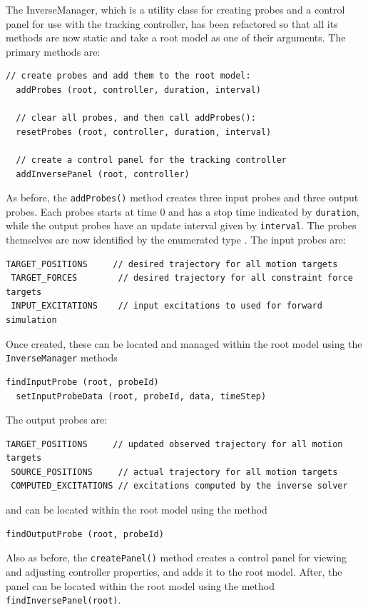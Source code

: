 \documentclass{article}
\begin{document}
The InverseManager, which is a utility class for creating probes and a
control panel for use with the tracking controller, has been
refactored so that all its methods are now static and take a root
model as one of their arguments. The primary methods are:
%
\begin{lstlisting}[]
  // create probes and add them to the root model:
  addProbes (root, controller, duration, interval) 

  // clear all probes, and then call addProbes():
  resetProbes (root, controller, duration, interval)

  // create a control panel for the tracking controller
  addInversePanel (root, controller)
\end{lstlisting}
%
As before, the {\tt addProbes()} method creates three input probes and
three output probes. Each probes starts at time 0 and has a stop time
indicated by {\tt duration}, while the output probes have an update
interval given by {\tt interval}. The probes themselves are now
identified by the enumerated type
.
The input probes are:
%
\begin{lstlisting}[]
 TARGET_POSITIONS     // desired trajectory for all motion targets
 TARGET_FORCES        // desired trajectory for all constraint force targets
 INPUT_EXCITATIONS    // input excitations to used for forward simulation
\end{lstlisting}
%
Once created, these can be located and managed within the root model using
the {\tt InverseManager} methods
%
\begin{lstlisting}[]
  findInputProbe (root, probeId)
  setInputProbeData (root, probeId, data, timeStep)
\end{lstlisting}
%
The output probes are:
%
\begin{lstlisting}[]
 TARGET_POSITIONS     // updated observed trajectory for all motion targets
 SOURCE_POSITIONS     // actual trajectory for all motion targets
 COMPUTED_EXCITATIONS // excitations computed by the inverse solver
\end{lstlisting}
%
and can be located within the root model using the
method
%
\begin{lstlisting}[]
  findOutputProbe (root, probeId)
\end{lstlisting}
%

Also as before, the {\tt createPanel()} method creates a control panel
for viewing and adjusting controller properties, and adds it to the
root model. After, the panel can be located within the root model
using the method {\tt findInversePanel(root)}.
\end{document}
